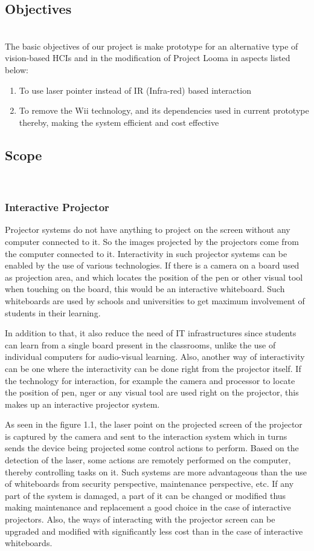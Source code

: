 \documentclass[12pt, a4paper]{article}
\begin{document}
\subsection{Objectives}
~\\
The basic objectives of our project is make prototype for an alternative type of vision-based HCIs and in the modification of Project Looma in aspects listed below:
\begin{enumerate}
	\item To use laser pointer instead of IR (Infra-red) based interaction
	\item To remove the Wii technology, and its dependencies used in current prototype thereby, making the system efficient and cost effective
\end{enumerate}

\subsection{Scope}
~\\
\subsubsection{Interactive Projector}
Projector systems do not have anything to project on the screen without
any computer connected to it. So the images projected by the projectors
come from the computer connected to it. Interactivity in such projector
systems can be enabled by the use of various technologies. If there is a camera
on a board used as projection area, and which locates the position of the pen
or other visual tool when touching on the board, this would be an interactive
whiteboard. Such whiteboards are used by schools and universities to get
maximum involvement of students in their learning. 

In addition to that, it also reduce the need of IT infrastructures since students can learn from a
single board present in the classrooms, unlike the use of individual computers
for audio-visual learning. Also, another way of interactivity can be one where
the interactivity can be done right from the projector itself. If the technology
for interaction, for example the camera and processor to locate the position
of pen, nger or any visual tool are used right on the projector, this makes up
an interactive projector system. 

As seen in the figure 1.1, the laser point on the projected screen of the projector is captured by the camera and sent to the interaction system which in turns sends the device being projected some control actions to perform. Based on the detection of the laser, some actions are remotely performed on the computer, thereby controlling tasks on it. Such systems are more advantageous than
the use of whiteboards from security perspective, maintenance perspective,
etc. If any part of the system is damaged, a part of it can be changed
or modified thus making maintenance and replacement a good choice in the
case of interactive projectors. Also, the ways of interacting with the projector
screen can be upgraded and modified with significantly less cost than in the
case of interactive whiteboards. 
\end{document}
